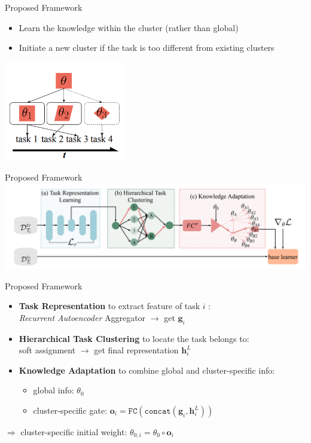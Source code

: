 \documentclass{beamer}
\begin{document}
\begin{frame}{Proposed Framework}
  \begin{itemize}
    \item Learn the knowledge within the cluster (rather than global)
    \item Initiate a new cluster if the task is too different from existing clusters
  \end{itemize}
    \center \includegraphics[width=0.4\textwidth]{fig/p3-specific.png}
\end{frame}

\begin{frame}{Proposed Framework}
    \center \includegraphics[width=\textwidth]{fig/p3-arch.png}
\end{frame}

\begin{frame}{Proposed Framework}
  \begin{itemize}
    \item \textbf{Task Representation} to extract feature of task $i$ :\\ \textit{Recurrent Autoencoder} Aggregator $\rightarrow$ get $\mathbf{g}_i$
    \item \textbf{Hierarchical Task Clustering} to locate the task belongs to:\\ soft assignment $\rightarrow$ get final representation $\mathbf{h}_i^L$ 
    \item \textbf{Knowledge Adaptation} to combine global and cluster-specific info: \\
      \begin{itemize}
        \item global info: $\theta_0$
        \item cluster-specific gate: $\mathbf{o}_i = \texttt{FC}(\texttt{concat}(\mathbf{g}_i,\mathbf{h}_i^L))$
      \end{itemize}
  \end{itemize}
  \center $\Rightarrow$ cluster-specific initial weight: $\theta_{0,i} = \theta_0 \circ \mathbf{o}_i$
\end{frame}
\end{document}
